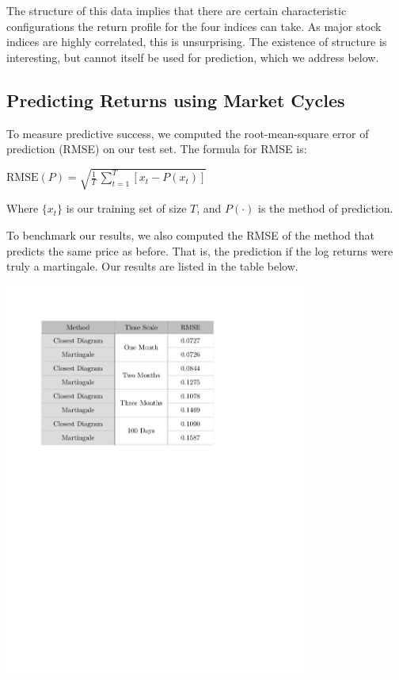 \documentclass{article}
\begin{document}
The structure of this data implies that there are certain characteristic configurations the return profile for the four indices can take. As major stock indices are highly correlated, this is unsurprising. The existence of structure is interesting, but cannot itself be used for prediction, which we address below.


\newpage

\subsection{Predicting Returns using Market Cycles}
To measure predictive success, we computed the root-mean-square error of prediction (RMSE) on our test set. The formula for RMSE is: 

\begin{center}{
$\mathrm{RMSE}(P) = \sqrt{\frac{1}{T} \, \sum\limits_{t=1}^T [x_t - P(x_t)]} $
}\end{center}

Where  $\{x_t\}$ is our training set of size $T$, and $P(\cdot)$ is the method of prediction.

To benchmark our results, we also computed the RMSE of the method that predicts the same price as before. That is, the prediction if the log returns were truly a martingale. Our results are listed in the table below.

\begin{center}{
\includegraphics[width=0.75\textwidth]{rmse}
}\end{center}
\end{document}
